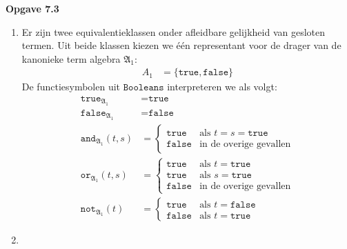 \documentclass[a4paper,11pt]{article}
\begin{document}
{\bf Opgave 7.3}

\begin{enumerate}

\item %

Er zijn twee equivalentieklassen onder afleidbare gelijkheid van gesloten
termen. Uit beide klassen kiezen we \'e\'en representant voor de drager van de
kanonieke term algebra $\mathfrak{A}_{1}$:
\begin{align*}
A_{1} &= \{\texttt{true}, \texttt{false}\}
\end{align*}
De functiesymbolen uit $\texttt{Booleans}$ interpreteren we als volgt:
\begin{align*}
\texttt{true}_{\mathfrak{A}_{1}}     &= \texttt{true} \\
\texttt{false}_{\mathfrak{A}_{1}}    &= \texttt{false} \\
\texttt{and}_{\mathfrak{A}_{1}}(t,s) &= \begin{cases}
  \texttt{true}  & \text{als $t = s = \texttt{true}$} \\
  \texttt{false} & \text{in de overige gevallen}
\end{cases} \\
\texttt{or}_{\mathfrak{A}_{1}}(t,s) &= \begin{cases}
  \texttt{true}  & \text{als $t = \texttt{true}$} \\
  \texttt{true}  & \text{als $s = \texttt{true}$} \\
  \texttt{false} & \text{in de overige gevallen}
\end{cases} \\
\texttt{not}_{\mathfrak{A}_{1}}(t) &= \begin{cases}
  \texttt{true}  & \text{als $t = \texttt{false}$} \\
  \texttt{false} & \text{als $t = \texttt{true}$}
\end{cases}
\end{align*}

\item %


\end{enumerate}
\end{document}
